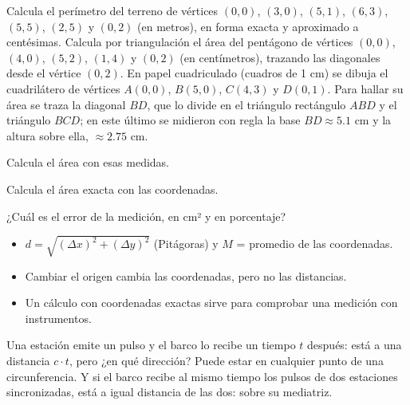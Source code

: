 \documentclass[11pt]{article}
\begin{document}
\begin{preguntas}
\pregunta Calcula el perímetro del terreno de vértices $(0, 0)$, $(3, 0)$, $(5, 1)$,
$(6, 3)$, $(5, 5)$, $(2, 5)$ y $(0, 2)$ (en metros), en forma exacta y aproximado a
centésimas.
\espacio{3.5cm}
\pregunta Calcula por triangulación el área del pentágono de vértices $(0, 0)$,
$(4, 0)$, $(5, 2)$, $(1, 4)$ y $(0, 2)$ (en centímetros), trazando las diagonales
desde el vértice $(0, 2)$.
\espacio{3cm}
\pregunta En papel cuadriculado (cuadros de 1 cm) se dibuja el cuadrilátero de
vértices $A(0, 0)$, $B(5, 0)$, $C(4, 3)$ y $D(0, 1)$. Para hallar su área se traza la
diagonal $BD$, que lo divide en el triángulo rectángulo $ABD$ y el triángulo $BCD$;
en este último se midieron con regla la base $BD \approx \num{5,1}$ cm y la altura
sobre ella, $\approx \num{2,75}$ cm.
\begin{opciones}
  \item Calcula el área con esas medidas.
  \item Calcula el área exacta con las coordenadas.
  \item ¿Cuál es el error de la medición, en cm² y en porcentaje?
\end{opciones}
\espacio{3.5cm}
\end{preguntas}

\begin{resumen}
\begin{itemize}
  \item $d = \sqrt{(\Delta x)^2 + (\Delta y)^2}$ (Pitágoras) y $M$ = promedio de las coordenadas.
  \item Cambiar el origen cambia las coordenadas, pero no las distancias.
  \item Un cálculo con coordenadas exactas sirve para comprobar una medición con instrumentos.
\end{itemize}
\end{resumen}

\label{tema:lugares}

\begin{hilo}
Una estación emite un pulso y el barco lo recibe un tiempo $t$ después: está a una
distancia $c \cdot t$, pero ¿en qué dirección? Puede estar en cualquier punto de una
circunferencia. Y si el barco recibe al mismo tiempo los pulsos de dos estaciones
sincronizadas, está a igual distancia de las dos: sobre su mediatriz.
\end{hilo}
\end{document}
